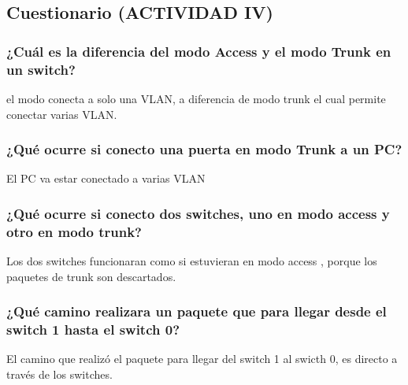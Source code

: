 \documentclass[spanish]{udpreport}
\begin{document}
\subsection{Cuestionario (ACTIVIDAD IV)}
\subsubsection {¿Cuál es la diferencia del modo Access y el modo Trunk en un switch?}
el  modo conecta a solo una VLAN, a diferencia de modo trunk el cual permite conectar varias VLAN.
\subsubsection{¿Qué ocurre si conecto una puerta en modo Trunk a un PC?}

El PC va estar conectado a varias VLAN
\subsubsection{¿Qué ocurre si conecto dos switches, uno en modo access y otro en modo trunk?}
Los dos switches funcionaran como si estuvieran en modo access , porque los paquetes de trunk son descartados.
\subsubsection{¿Qué camino realizara un paquete que para llegar desde el switch 1 hasta el
switch 0?}
El camino que realizó el paquete para llegar del switch 1 al swicth 0, es directo a través de los switches.
\listoffigures
\end{document}
